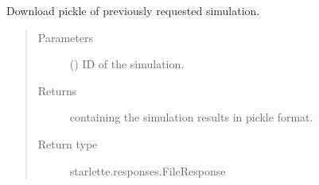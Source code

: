 \documentclass[a4paper,landscape,10pt,english]{sphinxmanual}
\begin{document}
\begin{fulllineitems}
\label{\detokenize{code_docs/simulation_API.controller:simulation_API.controller.main.api_results_sim_id_pickle}}
Download pickle of previously requested simulation.
\begin{quote}\begin{description}
\item[{Parameters}] \leavevmode
{} () \textendash{} ID of the simulation.

\item[{Returns}] \leavevmode
{} containing the simulation results
in pickle format.

\item[{Return type}] \leavevmode
starlette.responses.FileResponse

\end{description}\end{quote}

\end{fulllineitems}

\end{document}
